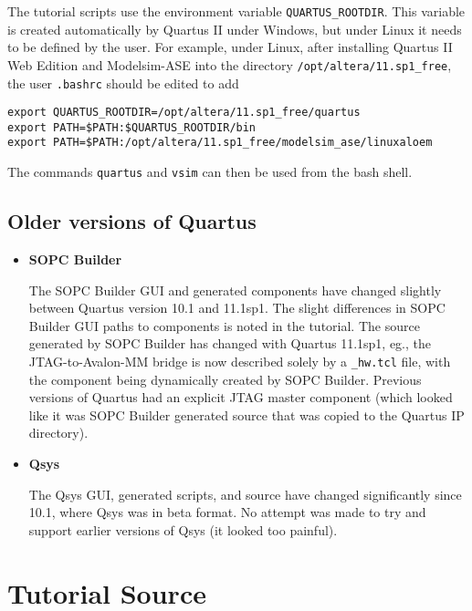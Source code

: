 \documentclass[10pt,twoside]{article}
\begin{document}
\begin{itemize}
The tutorial scripts use the environment variable \verb+QUARTUS_ROOTDIR+.
This variable is created automatically by Quartus II under 
Windows, but under Linux it needs to be defined by the user.
For example, under Linux, after installing Quartus II Web Edition
and Modelsim-ASE into the directory
\verb+/opt/altera/11.sp1_free+, the user \verb+.bashrc+ 
should be edited to add
%
\begin{verbatim}
export QUARTUS_ROOTDIR=/opt/altera/11.sp1_free/quartus
export PATH=$PATH:$QUARTUS_ROOTDIR/bin
export PATH=$PATH:/opt/altera/11.sp1_free/modelsim_ase/linuxaloem
\end{verbatim}
%
The commands \verb+quartus+ and \verb+vsim+ can then be used
from the bash shell.

\end{itemize}

\clearpage
\subsection*{Older versions of Quartus}

\begin{itemize}
\item {\bf SOPC Builder}

The SOPC Builder GUI and generated components have changed slightly between
Quartus version 10.1 and 11.1sp1. The slight differences in SOPC Builder
GUI paths to components is noted in the tutorial. The source
generated by SOPC Builder has changed with Quartus 11.1sp1,
eg., the JTAG-to-Avalon-MM bridge is now described solely by
a \verb+_hw.tcl+ file, with the component being dynamically
created by SOPC Builder. Previous versions of Quartus had an
explicit JTAG master component (which looked like it was SOPC
Builder generated source that was copied to the Quartus IP directory).

\item {\bf Qsys}

The Qsys GUI, generated scripts, and source have changed significantly
since 10.1, where Qsys was in beta format. No attempt was made to try
and support earlier versions of Qsys (it looked too painful).
\end{itemize}

\section{Tutorial Source}
\label{app:tutorial_source}
\end{document}
